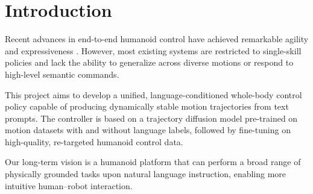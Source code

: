 \section{Introduction}
Recent advances in end-to-end humanoid control have achieved remarkable agility and expressiveness 
\cite{beyondmimic, exbody2, expressive-humanoid, falcon, amo}.
However, most existing systems are restricted to single-skill policies and lack the ability to generalize across diverse motions or respond to high-level semantic commands.

This project aims to develop a unified, language-conditioned whole-body control policy capable of producing dynamically stable motion trajectories from text prompts. 
The controller is based on a trajectory diffusion model pre-trained on motion datasets with and without language labels, followed by fine-tuning on high-quality, re-targeted humanoid control data.

Our long-term vision is a humanoid platform that can perform a broad range of physically grounded tasks upon natural language instruction, enabling more intuitive human–robot interaction.